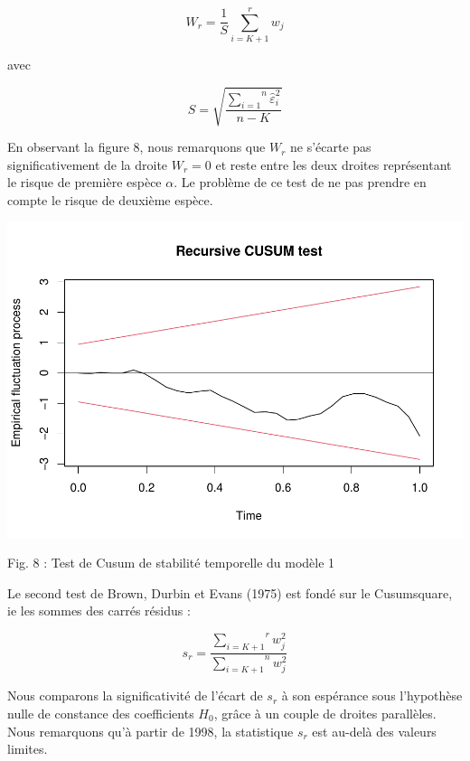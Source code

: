 \documentclass[
]{article}
\begin{document}
\begin{equation}    
\label{eq:wr}    
W_r = \frac{1}{S} \overset{r}{\underset{i=K+1}{\sum}} w_j
\end{equation}

avec

\begin{equation}
\label{eq:S}

S = \sqrt{\frac{\overset{n}{\underset{i=1}{\sum}} \hat{\varepsilon}_i^2}{n - K}}
\end{equation}

En observant la figure 8, nous remarquons que \(W_r\) ne s'écarte pas
significativement de la droite \(W_r = 0\) et reste entre les deux
droites représentant le risque de première espèce \(\alpha\). Le
problème de ce test de ne pas prendre en compte le risque de deuxième
espèce.

\begin{center}\includegraphics[width=0.7\linewidth,height=0.7\textheight]{Projet_econometrie_II_files/figure-latex/unnamed-chunk-7-1} \end{center}

Fig. 8 : Test de Cusum de stabilité temporelle du modèle 1

\newline

Le second test de Brown, Durbin et Evans (1975) est fondé sur le
Cusumsquare, ie les sommes des carrés résidus :

\begin{equation}
\label{eq:sr}
s_r = \frac{\overset{r}{\underset{i=K+1}{\sum}} w_j^2}{\overset{n}{\underset{i=K+1}{\sum}} w_j^2}
\end{equation}

Nous comparons la significativité de l'écart de \(s_r\) à son espérance
sous l'hypothèse nulle de constance des coefficients \(H_0\), grâce à un
couple de droites parallèles. Nous remarquons qu'à partir de 1998, la
statistique \(s_r\) est au-delà des valeurs limites.
\end{document}
